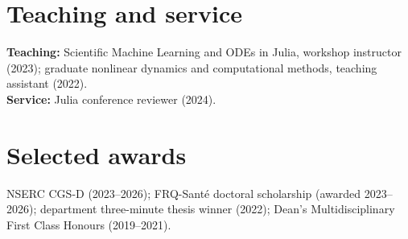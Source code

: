 \documentclass[11pt,letterpaper]{article}
\begin{document}
\section*{Teaching and service}
\textbf{Teaching:} Scientific Machine Learning and ODEs in Julia, workshop instructor (2023); graduate nonlinear dynamics and computational methods, teaching assistant (2022).\\
\textbf{Service:} Julia conference reviewer (2024).

\section*{Selected awards}
NSERC CGS-D (2023--2026); FRQ-Santé doctoral scholarship (awarded 2023--2026); department three-minute thesis winner (2022); Dean's Multidisciplinary First Class Honours (2019--2021).
\end{document}
